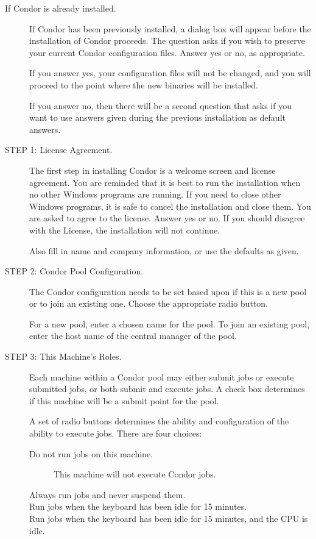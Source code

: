\begin{description}
\item[If Condor is already installed.]

     If Condor has been previously installed,
     a dialog box will appear before the installation of Condor proceeds.
     The question asks if you wish to preserve your current
     Condor configuration files.
     Answer yes or no, as appropriate.
	 
     If you answer yes, your configuration files will not be changed, 
     and you will proceed to the point where the new binaries will be installed.

     If you answer no, then there will be a second question
     that asks if you want to use answers
     given during the previous installation
     as default answers.

\item[STEP 1: License Agreement.]

     The first step in installing Condor
     is a welcome screen and license agreement.
     You are reminded that it is best to run the installation
     when no other Windows programs are running.
     If you need to close other Windows programs, it is safe to cancel the
     installation and close them.
     You are asked to agree to the license.
     Answer yes or no.  If you should disagree with the License, the
     installation will not continue.

     Also fill in name and company information,
     or use the defaults as given.

\item[STEP 2: Condor Pool Configuration.]

     The Condor configuration needs to be set based upon
     if this is a new pool or to join an existing one.
     Choose the appropriate radio button.

     For a new pool, enter a chosen name for the pool.
     To join an existing pool, 
     enter the host name of the central manager of the pool.

\item[STEP 3: This Machine's Roles.] 

     Each machine within a Condor pool may either
     submit jobs or execute submitted jobs, or both
     submit and execute jobs.
     A check box determines if this machine will be a submit point for
     the pool.

     A set of radio buttons determines the ability and configuration of
     the ability to execute jobs.
     There are four choices:
     \begin{description}
     \item[Do not run jobs on this machine.]
     This machine will not execute Condor jobs.
     \item[Always run jobs and never suspend them.]
     \item[Run jobs when the keyboard has been idle for 15 minutes.]
     \item[Run jobs when the keyboard has been idle for 15 minutes,
and the CPU is idle.]
     \end{description}


\end{description}
